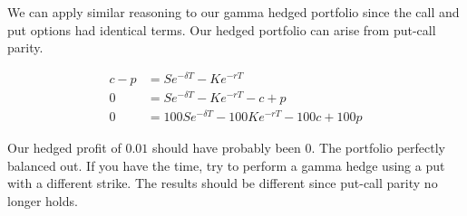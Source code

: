 \documentclass{ximera}
\begin{document}
We can apply similar reasoning to our gamma hedged portfolio since the call and put options had identical terms. Our hedged portfolio can arise from put-call parity.

\begin{align*}
c-p 	&=Se^{-\delta T}-Ke^{-rT}\\
0 	&=Se^{-\delta T}-Ke^{-rT}-c+p\\
0	&=100Se^{-\delta T}-100Ke^{-rT}-100c+100p
\end{align*}

Our hedged profit of $0.01$ should have probably been $0$. The portfolio perfectly balanced out. If you have the time, try to perform a gamma hedge using a put with a different strike. The results should be different since put-call parity no longer holds.
\end{document}
